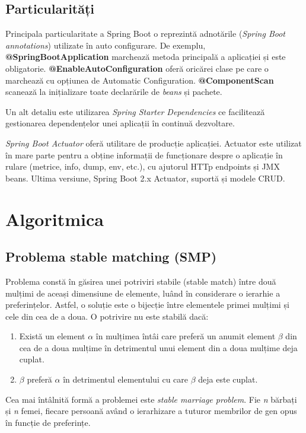 \subsection{Particularități}
Principala particularitate a Spring Boot o reprezintă adnotările (\textit{Spring Boot annotations}) utilizate în auto configurare.
De exemplu, \textbf{@SpringBootApplication} marchează metoda principală a aplicației și este obligatorie.
\textbf{@EnableAutoConfiguration} oferă oricărei clase pe care o marchează cu opțiunea de Automatic Configuration.
\textbf{@ComponentScan} scanează la inițializare toate declarările de \textit{beans} și pachete.

Un alt detaliu este utilizarea \textit{Spring Starter Dependencies} ce facilitează gestionarea dependențelor unei aplicații în continuă dezvoltare.

\textit{Spring Boot Actuator} oferă utilitare de producție aplicației. Actuator este utilizat în mare parte pentru a obține informații de funcționare despre o aplicație în rulare (metrice, info, dump, env, etc.), cu ajutorul HTTp endpoints și JMX beans.
Ultima versiune, Spring Boot 2.x Actuator, suportă și modele CRUD.

\section{Algoritmica}
\subsection{Problema stable matching (SMP)}
Problema constă în găsirea unei potriviri stabile (stable match) între două mulțimi de aceași dimensiune de elemente, luând în considerare o ierarhie a preferințelor. Astfel, o soluție este o bijecție între elementele primei mulțimi și cele din cea de a doua. O potrivire nu este stabilă dacă:

\begin{enumerate}
	\item Există un element $\alpha$ în mulțimea întâi care preferă un anumit element $\beta$ din cea de a doua mulțime în detrimentul unui element din a doua mulțime deja cuplat.
	\item $\beta$ preferă $\alpha$ în detrimentul elementului cu care $\beta$ deja este cuplat.
\end{enumerate}

Cea mai întâlnită formă a problemei este \textit{stable marriage problem}. Fie \textit{n} bărbați și \textit{n} femei, fiecare persoană având o ierarhizare a tuturor membrilor de gen opus în funcție de preferințe. 

